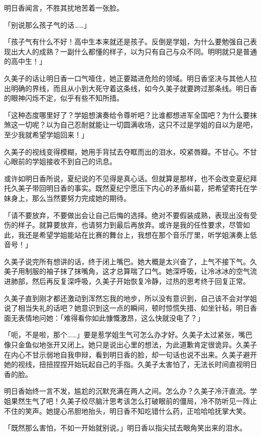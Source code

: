 \documentclass[UTF8]{ctexart}
\begin{document}
    明日香闻言，不胜其扰地苦着一张脸。 

    「别说那么孩子气的话……」 

    「孩子气有什么不好！高中生本来就还是孩子。反倒是学姐，为什么要勉强自己表现出大人的成熟？一副什么都懂的样子，以为只有自己与众不同。明明就只是普通的高中生！」 

    久美子的话让明日香一口气噎住，她正要踏进危险的领域。明日香坚决与其他人拉出明确的界线，而且从小到大死守着这条线，如今久美子就要跨过那条线。明日香的眼神闪烁不定，似乎有些不知所措。 

    「这种态度哪里好了？学姐想演奏给令尊听吧？比谁都想进军全国吧？为什么要抹煞这一切呢？以为自己忍耐就能让一切圆满收场，这只不过是学姐的自以为是吧，至少我就希望学姐回来！」 

    久美子的视线变得模糊，她用手背拭去夺眶而出的泪水，咬紧唇瓣。不甘心。不甘心眼前的学姐接收不到自己的讯息。 

    或许如明日香所说，夏纪说的不见得是真心话。但就算是那样，也不会改变夏纪拜托久美子带回明日香的事实。既然夏纪宁愿压下内心的矛盾纠葛，把希望寄托在学妹身上，那么当然要努力完成她的期待。 

    「请不要放弃，不要做出会让自己后悔的选择。绝对不要假装成熟，表现出没有受伤的样子。就算要放弃，也请努力到最后再放弃。或许是我的任性要求，尽管如此，我还是希望学姐能站在比赛的舞台上，我想在那个音乐厅里，听学姐演奏上低音号！」 

    久美子说完所有想讲的话，终于闭上嘴巴。她大概是太兴奋了，上气不接下气。久美子用制服的袖子抹了抹嘴角，这才总算喘了口气。她深呼吸，让冷冰冰的空气流进肺部，然后再反复深呼吸，久美子开始恢复冷静，过热的思考终于回复正常。 

    久美子直到刚才都还激动到浑然忘我的地步，所以没有意识到，自己该不会对学姐说了相当失礼的话吧？她意识到这一点的瞬间，顿时惊慌失措、如坐针毡，明日香面无表情地问她：「难得看你如此慷慨激昂，这么快就没电了？」 

    「呃，不是啦，那个……」要是惹学姐生气可怎么办才好。久美子太过紧张，嘴巴像只金鱼似地张开又闭上。她只是说出心里的想法，为此道歉肯定很诡异。久美子在内心不甘示弱地自我申辩，看到明日香的脸，却一句话也说不出来。久美子避开她的视线，扭扭捏捏开始玩起自己的手指。久美子太害怕了，无法长时间直视明日香的脸。 

    明日香始终一言不发，尴尬的沉默充满在两人之间。怎么办？久美子冷汗直流。学姐果然生气了吧！久美子绞尽脑汁思考该怎么打破眼前的僵局，冷不防听见一阵止不住的笑声。她提心吊胆地抬头，明日香不知吃错什么药，正哈哈哈抚掌大笑。 

    「既然那么害怕，不如一开始就别说。」明日香以指尖拭去眼角笑出来的泪水。 
\end{document}
